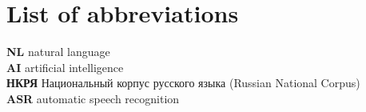 \chapter*{List of abbreviations}

\noindent
\textbf{NL} natural language\\
\textbf{AI} artificial intelligence\\
\textbf{НКРЯ} Национальный корпус русского языка (Russian National Corpus)\\
\textbf{ASR} automatic speech recognition